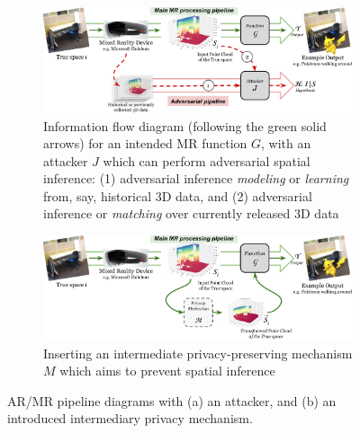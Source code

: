 \begin{figure}[t]
	\centering
	\vspace{2mm}
	\begin{subfigure}{\columnwidth}
		\includegraphics[width=\columnwidth]{figures/adversary-model-pipeline-v6-revised-a.pdf}
		\caption{\footnotesize Information flow diagram (following the green solid arrows) for an intended MR function $G$, with an attacker $J$ which can perform adversarial spatial inference: (1) adversarial inference \textit{modeling} or \textit{learning} from, say, historical 3D data, and (2) adversarial inference or \textit{matching} over currently released 3D data}
		\label{fig:generic-pipeline}
    	\vspace{3mm}
	\end{subfigure}
	\begin{subfigure}{\columnwidth}
		\includegraphics[width=\columnwidth]{figures/adversary-model-pipeline-v6-revised-b.pdf}
		\caption{\footnotesize Inserting an intermediate privacy-preserving mechanism $M$ which aims to prevent spatial inference}
		\label{fig:with-privacy-mechanism}
	\end{subfigure}
	\vspace{-3mm}
    \caption{\small AR/MR pipeline diagrams with (a) an attacker, and (b) an introduced intermediary privacy mechanism.}
	\label{fig:adversary-model-pipeline}
	\vspace{-5mm}
\end{figure}

